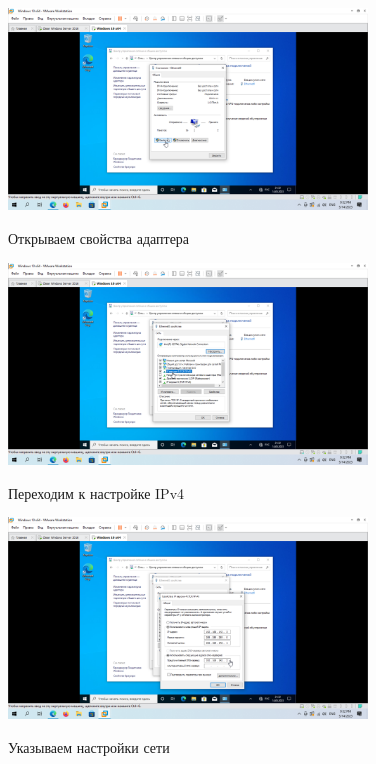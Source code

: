 \documentclass[a4paper]{article}
\begin{document}
  \begin{figure}[H]
    \centering
    \includegraphics[width=0.85\textwidth]{5_0065}
    \label{img:65}
    \caption{Открываем свойства адаптера}
  \end{figure}

  \begin{figure}[H]
    \centering
    \includegraphics[width=0.85\textwidth]{5_0066}
    \label{img:66}
    \caption{Переходим к настройке IPv4}
  \end{figure}

  \begin{figure}[H]
    \centering
    \includegraphics[width=0.85\textwidth]{5_0067}
    \label{img:67}
    \caption{Указываем настройки сети}
  \end{figure}
\end{document}
